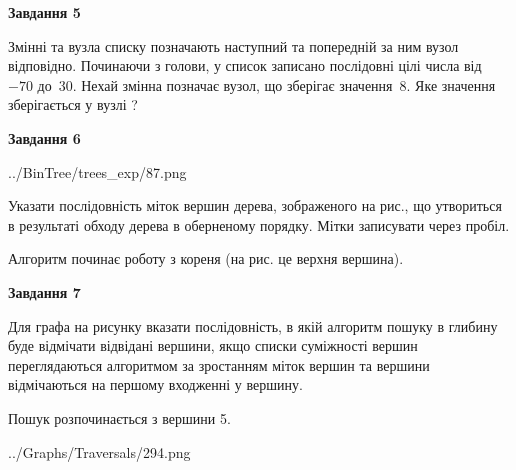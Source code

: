 \documentclass[12pt, ukrainian]{article}
\begin{document}
{\begin {large}
{\begin {center}\textbf{Завдання 5}\end {center}}\par
Змінні  та  вузла списку позначають наступний та попередній за ним вузол відповідно. Починаючи з голови, у список записано послідовні цілі числа від~$-70$ до~$30$. Нехай змінна  позначає вузол, що зберігає значення~$8$.
Яке значення зберігається у вузлі  ?\par
\newpage

{\begin {center}\textbf{Завдання 6}\end {center}}\par

\begin{center}
	{../BinTree/trees_exp/87.png}
\end{center}
Указати послідовність міток вершин дерева, зображеного на рис., що утвориться в результаті обходу дерева в оберненому порядку. Мітки записувати через пробіл.\par Алгоритм починає роботу з кореня (на рис. це верхня вершина).\par
\newpage

{\begin {center}\textbf{Завдання 7}\end {center}}\par
Для графа на рисунку вказати послідовність, в якій алгоритм пошуку в глибину буде відмічати відвідані вершини, якщо списки суміжності вершин переглядаються алгоритмом за зростанням міток вершин та вершини відмічаються на першому вход\-женні у вершину.\par
Пошук розпочинається з вершини 5.\par

\begin{center}
	{../Graphs/Traversals/294.png}
\end{center}\par
\newpage


\end{large}}
\end{document}
